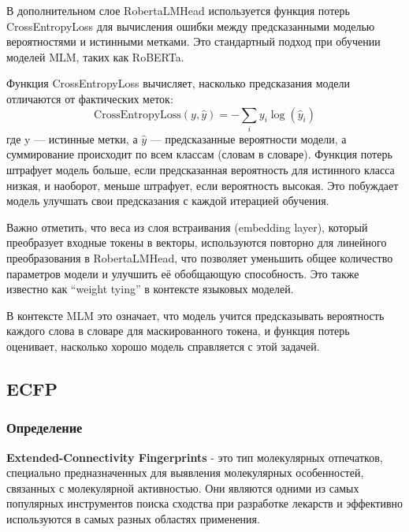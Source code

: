 \newline В дополнительном слое RobertaLMHead используется функция потерь CrossEntropyLoss для вычисления ошибки между предсказанными моделью вероятностями и истинными метками. Это стандартный подход при обучении моделей MLM, таких как RoBERTa. 

Функция CrossEntropyLoss вычисляет, насколько предсказания модели отличаются от фактических меток: 
\begin{equation}
\text{CrossEntropyLoss}(y, \hat{y}) = -\sum_{i} y_{i} \log(\hat{y}_{i})
\end{equation}
где y — истинные метки, а $\hat{y}$ — предсказанные вероятности модели, а суммирование происходит по всем классам (словам в словаре). Функция потерь штрафует модель больше, если предсказанная вероятность для истинного класса низкая, и наоборот, меньше штрафует, если вероятность высокая. Это побуждает модель улучшать свои предсказания с каждой итерацией обучения.

\newline Важно отметить, что веса из слоя встраивания (embedding layer), который преобразует входные токены в векторы, используются повторно для линейного преобразования в RobertaLMHead, что позволяет уменьшить общее количество параметров модели и улучшить её обобщающую способность. Это также известно как “weight tying” в контексте языковых моделей.

\newline В контексте MLM это означает, что модель учится предсказывать вероятность каждого слова в словаре для маскированного токена, и функция потерь оценивает, насколько хорошо модель справляется с этой задачей.

\subsection{ECFP}

\subsubsection{Определение}
\textbf{Extended-Connectivity Fingerprints} - это тип молекулярных отпечатков, специально предназначенных для выявления молекулярных особенностей, связанных с молекулярной активностью. Они являются одними из самых популярных инструментов поиска сходства при разработке лекарств и эффективно используются в самых разных областях применения.

